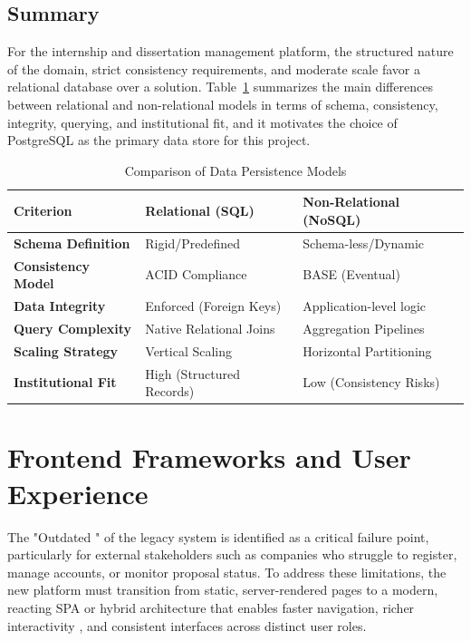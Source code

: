     \subsection*{Summary}
        {
            For the internship and dissertation management platform, the structured nature of the domain, strict consistency requirements, and moderate scale favor a relational  database over a 
            solution. Table~\ref{tab:data_persitance_comparison} summarizes the main differences between relational and non-relational models in terms of schema, consistency, integrity, querying, and institutional fit,
            and it motivates the choice of PostgreSQL as the primary data store for this project.
        }
        \begin{table}[H]
            \centering
            \renewcommand{\arraystretch}{1.5} %
            \label{tab:data_persitance_comparison}
            \begin{tabularx}{\textwidth}{|l|X|X|}
                \hline
                \textbf{Criterion} & \textbf{Relational (SQL)} & \textbf{Non-Relational (NoSQL)}  \\ \hline
                \textbf{Schema Definition} & Rigid/Predefined & Schema-less/Dynamic \\ \hline
                \textbf{Consistency Model} & ACID Compliance & BASE (Eventual) \\ \hline
                \textbf{Data Integrity} & Enforced (Foreign Keys) & Application-level logic \\ \hline
                \textbf{Query Complexity} & Native Relational Joins & Aggregation Pipelines \\ \hline
                \textbf{Scaling Strategy} & Vertical Scaling & Horizontal Partitioning \\ \hline
                \textbf{Institutional Fit} & High (Structured Records) & Low (Consistency Risks) \\ \hline
            \end{tabularx}
            \caption{Comparison of Data Persistence Models}
        \end{table}
        

\section{Frontend Frameworks and User Experience}
\label{sec:sota_frontend}
\ntindex[Template]{}
        {
            The "Outdated " of the legacy system is identified as a critical failure point, particularly for external stakeholders such as companies who
            struggle to register, manage accounts, or monitor proposal status. 
            To address these limitations, the new platform must transition from static, server-rendered pages to
            a modern, reacting \gls{SPA} or hybrid architecture that enables faster navigation, richer interactivity \cite{react-docs-2026}, and consistent interfaces across distinct user roles.
        }

